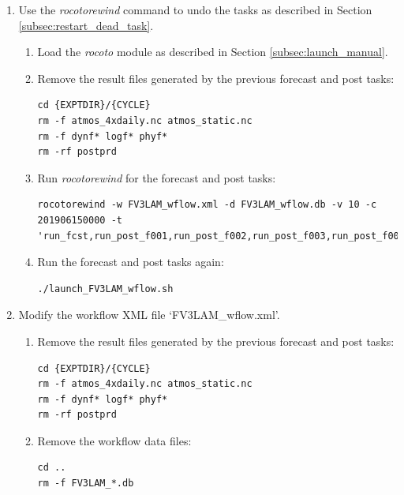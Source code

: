 \documentclass[11pt,fleqn]{report}              %
\begin{document}
\begin{enumerate}

\item Use the {\it rocotorewind} command to undo the tasks as described in Section \ref{subsec:restart_dead_task}.

\begin{enumerate}
\item Load the {\it rocoto} module as described in Section \ref{subsec:launch_manual}.

\item Remove the result files generated by the previous forecast and post tasks:
\lstset{language=bash}   
\begin{lstlisting}[frame=trBL]
cd {EXPTDIR}/{CYCLE}
rm -f atmos_4xdaily.nc atmos_static.nc
rm -f dynf* logf* phyf*
rm -rf postprd
\end{lstlisting}

\item Run {\it rocotorewind} for the forecast and post tasks:
\lstset{language=bash}   
\begin{lstlisting}[frame=trBL]
rocotorewind -w FV3LAM_wflow.xml -d FV3LAM_wflow.db -v 10 -c 201906150000 -t 'run_fcst,run_post_f001,run_post_f002,run_post_f003,run_post_f004,run_post_f005,run_post_f006'
\end{lstlisting}

\item Run the forecast and post tasks again:
\lstset{language=bash}   
\begin{lstlisting}[frame=trBL]
./launch_FV3LAM_wflow.sh
\end{lstlisting}
\end{enumerate}


\item Modify the workflow XML file `FV3LAM\_wflow.xml'.

\begin{enumerate}
\item Remove the result files generated by the previous forecast and post tasks:
\lstset{language=bash}   
\begin{lstlisting}[frame=trBL]
cd {EXPTDIR}/{CYCLE}
rm -f atmos_4xdaily.nc atmos_static.nc
rm -f dynf* logf* phyf*
rm -rf postprd
\end{lstlisting}

\item Remove the workflow data files:
\lstset{language=bash}   
\begin{lstlisting}[frame=trBL]
cd ..
rm -f FV3LAM_*.db
\end{lstlisting}


\end{enumerate}
\end{enumerate}
\end{document}
